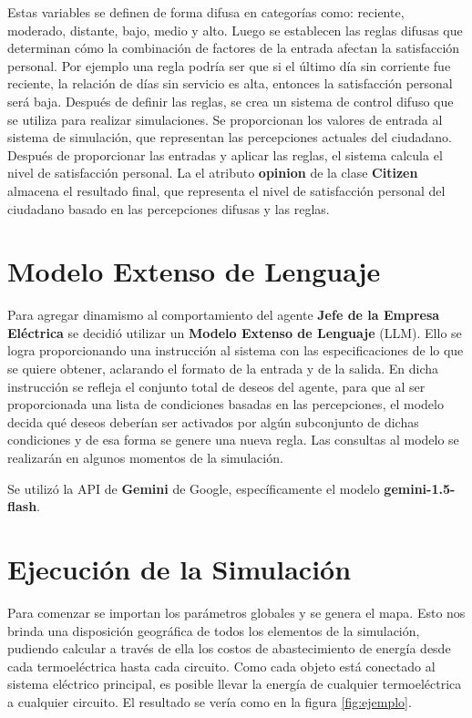 \documentclass[twocolumn, fontsize=10pt]{article}
\begin{document}
Estas variables se definen de forma difusa en categorías como: reciente, moderado, 
distante, bajo, medio y alto. Luego se 
establecen las reglas difusas que determinan cómo la combinación 
de factores de la entrada afectan la satisfacción personal. 
Por ejemplo una regla podría ser que si el último día sin corriente fue reciente, 
la relación de días sin servicio es alta, entonces la satisfacción personal será baja. 
Después de 
definir las reglas, se crea un sistema de control difuso que se 
utiliza para realizar simulaciones. Se proporcionan los valores 
de entrada al sistema de simulación, que representan las 
percepciones actuales del ciudadano. Después de proporcionar 
las entradas y aplicar las reglas, el sistema calcula el nivel 
de satisfacción personal. La el atributo \textbf{opinion} de la clase \textbf{Citizen} 
almacena el resultado final, que representa el nivel de satisfacción 
personal del ciudadano basado en las percepciones difusas y 
las reglas.

\section{Modelo Extenso de Lenguaje}

Para agregar dinamismo al comportamiento del agente \textbf{Jefe de la Empresa Eléctrica}
se decidió utilizar un \textbf{Modelo Extenso de Lenguaje} (LLM). Ello se logra proporcionando 
una instrucción al sistema con las especificaciones de lo que se quiere obtener, aclarando 
el formato de la entrada y de la salida. En dicha instrucción se refleja el conjunto total de deseos
del agente, para que al ser proporcionada una lista de condiciones basadas en las percepciones, el modelo decida 
qué deseos deberían ser activados por algún subconjunto de dichas condiciones y de esa forma se genere una nueva regla.
Las consultas al modelo se realizarán en algunos momentos de la simulación.

Se utilizó la API de \textbf{Gemini} de Google, específicamente el modelo \textbf{gemini-1.5-flash}.

\section{Ejecución de la Simulación}

Para comenzar se importan los parámetros globales y se genera el mapa. 
Esto nos brinda una disposición geográfica de todos los elementos de la simulación, 
pudiendo calcular a través de ella los costos de abastecimiento de energía
desde cada termoeléctrica hasta cada circuito. Como cada objeto está conectado al sistema 
eléctrico principal, es posible llevar la energía de cualquier termoeléctrica a cualquier circuito.
El resultado se vería como en la figura \ref{fig:ejemplo}.\\ 
\end{document}
